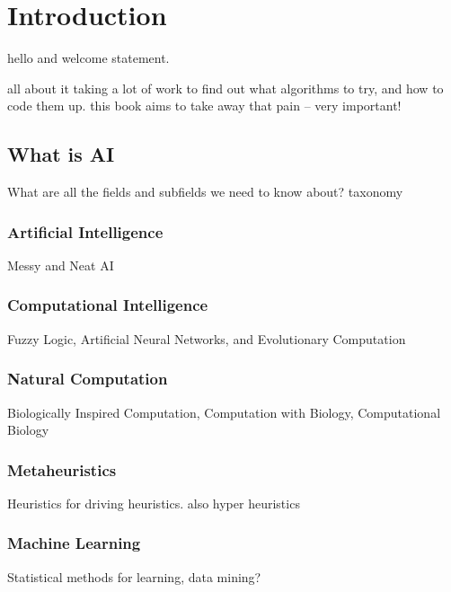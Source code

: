 


\chapter{Introduction}
\label{chap:intro}

hello and welcome statement.

all about it taking a lot of work to find out what algorithms to try, and how to code them up. this book aims to take away that pain -- very important!


% 
% 
\section{What is AI}
\label{intro:sec:what_is_ai}
What are all the fields and subfields we need to know about? 
taxonomy

\subsection{Artificial Intelligence}
Messy and Neat AI

\subsection{Computational Intelligence}
Fuzzy Logic, Artificial Neural Networks, and Evolutionary Computation

\subsection{Natural Computation}
Biologically Inspired Computation, Computation with Biology, Computational Biology

\subsection{Metaheuristics}
Heuristics for driving heuristics. also hyper heuristics

\subsection{Machine Learning}
Statistical methods for learning, data mining?

